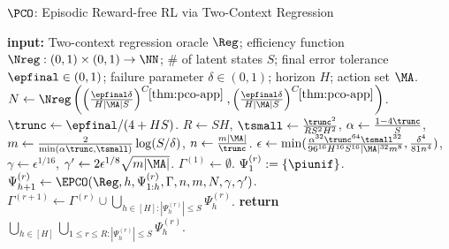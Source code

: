 \begin{algorithm}[t]
	\caption{$\PCO$: Episodic Reward-free RL via Two-Context Regression}
	\label{alg:pco}
	\begin{algorithmic}[1]\onehalfspacing
          \State \textbf{input:} Two-context regression oracle $\Reg$; efficiency function $\Nreg: (0,1)\times(0,1)\to\NN$; \# of latent states $S$; final error tolerance $\epfinal \in (0,1)$; failure parameter $\delta \in (0,1)$; horizon $H$; action set $\MA$.
        \State $N \gets \Nreg\left(\left(\frac{\epfinal\delta}{H|\MA|S}\right)^{C_{\ref{thm:pco-app}}},\left(\frac{\epfinal\delta}{H|\MA|S}\right)^{C_{\ref{thm:pco-app}}}\right)$.
        \State $\trunc \gets \epfinal/(4+HS)$.
        \State $R \gets SH$, $\tsmall \gets \frac{\trunc^2}{RS^2H^2}$, $\alpha \gets \frac{1-4\trunc}{S}$, $m \gets \frac{2}{\min(\alpha\trunc,\tsmall)}\log(S/\delta)$, $n \gets \frac{m|\MA|}{\trunc}$.
        \State $\epsilon \gets \min(\frac{\alpha^{32}\trunc^{64}\tsmall^{32}}{96^{16}H^{16}S^{16}|\MA|^{32}m^8}, \frac{\delta^4}{81n^4})$, $\gamma \gets \epsilon^{1/16}$, $\gamma' \gets 2\epsilon^{1/8}\sqrt{m|\MA|}$.
        \State $\Gamma^{(1)} \gets \emptyset$.
            \State $\Psi_1^{(r)} := \{\piunif\}$.
                \State $\Psi_{h+1}^{(r)} \gets \EPCO(\Reg, h, \Psi_{1:h}^{(r)}, \Gamma,n,m,N,\gamma,\gamma')$.
            \EndFor
            \State $\Gamma^{(r+1)} \gets \Gamma^{(r)} \cup \bigcup_{h \in [H]:|\Psi_h^{(r)}| \leq S} \Psi_h^{(r)}$.
        \EndFor
        \State \textbf{return} $\bigcup_{h \in [H]} \bigcup_{1 \leq r \leq R: |\Psi_h^{(r)}| \leq S} \Psi_h^{(r)}$.
	\end{algorithmic}
\end{algorithm}

